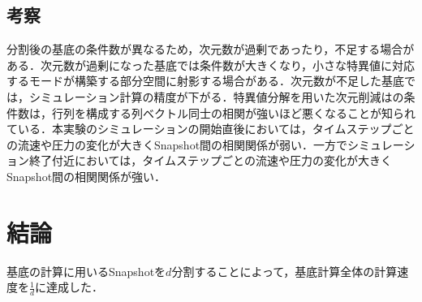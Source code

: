 \documentclass[a4j,12pt]{jreport}
\begin{document}
\section{考察}
分割後の基底の条件数が異なるため，次元数が過剰であったり，不足する場合がある．次元数が過剰になった基底では条件数が大きくなり，小さな特異値に対応するモードが構築する部分空間に射影する場合がある．次元数が不足した基底では，シミュレーション計算の精度が下がる．特異値分解を用いた次元削減はの条件数は，行列を構成する列ベクトル同士の相関が強いほど悪くなることが知られている．本実験のシミュレーションの開始直後においては，タイムステップごとの流速や圧力の変化が大きくSnapshot間の相関関係が弱い．一方でシミュレーション終了付近においては，タイムステップごとの流速や圧力の変化が大きくSnapshot間の相関関係が強い．
\chapter{結論}
基底の計算に用いるSnapshotを$d$分割することによって，基底計算全体の計算速度を$\frac{1}{d}$に達成した．


\end{document}
